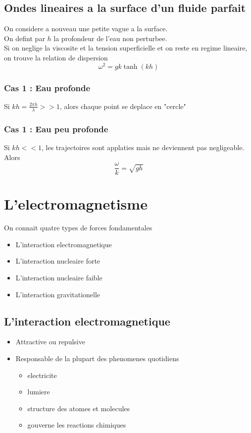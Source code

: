 \documentclass[../main.tex]{subfiles}
\begin{document}
\subsection{Ondes lineaires a la surface d'un fluide parfait}
On considere a nouveau une petite vague a la surface.\\
On defint par $h$ la profondeur de l'eau non perturbee.\\
Si on neglige la viscosite et la tension superficielle et on reste en regime lineaire, on trouve la relation de dispersion
\[ 
	\omega ^{2} = gk \tanh ( kh) 
\]
\subsubsection*{\textbf{ Cas 1 }: Eau profonde}
Si $kh = \frac{2 \pi h}{\lambda} >> 1$, alors chaque point se deplace en "cercle"
\subsubsection*{\textbf{ Cas 1 }: Eau peu profonde}
Si $kh << 1$, les trajectoires sont applaties mais ne deviennent pas negligeable. Alors
\[ 
\frac{\omega }{k} = \sqrt{g h} 
\]
\section{L'electromagnetisme}
On connait quatre types de forces fondamentales
\begin{itemize}
\item L'interaction electromagnetique
\item L'interaction nucleaire forte 
\item L'interaction nucleaire faible
\item L'interaction gravitationelle
\end{itemize}
\subsection*{L'interaction electromagnetique}
\begin{itemize}
\item Attractive ou repulsive
\item Responsable de la plupart des phenomenes quotidiens
\begin{itemize}
\item electricite
\item lumiere
\item structure des atomes et molecules
\item gouverne les reactions chimiques
\end{itemize}
\end{itemize}
\end{document}
